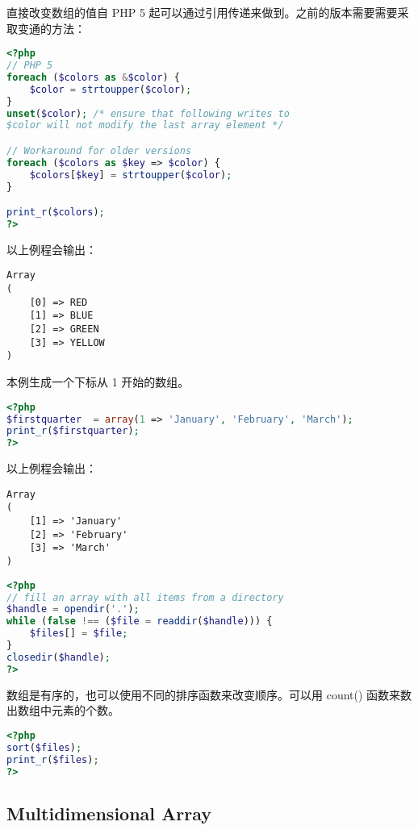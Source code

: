 直接改变数组的值自 PHP 5 起可以通过引用传递来做到。之前的版本需要需要采取变通的方法：





\begin{lstlisting}[language=PHP]
<?php
// PHP 5
foreach ($colors as &$color) {
    $color = strtoupper($color);
}
unset($color); /* ensure that following writes to
$color will not modify the last array element */

// Workaround for older versions
foreach ($colors as $key => $color) {
    $colors[$key] = strtoupper($color);
}

print_r($colors);
?>
\end{lstlisting}

以上例程会输出：


\begin{verbatim}
Array
(
    [0] => RED
    [1] => BLUE
    [2] => GREEN
    [3] => YELLOW
)
\end{verbatim}


本例生成一个下标从 1 开始的数组。

\begin{lstlisting}[language=PHP]
<?php
$firstquarter  = array(1 => 'January', 'February', 'March');
print_r($firstquarter);
?>
\end{lstlisting}

以上例程会输出：


\begin{verbatim}
Array 
(
    [1] => 'January'
    [2] => 'February'
    [3] => 'March'
)
\end{verbatim}




\begin{lstlisting}[language=PHP]
<?php
// fill an array with all items from a directory
$handle = opendir('.');
while (false !== ($file = readdir($handle))) {
    $files[] = $file;
}
closedir($handle); 
?>
\end{lstlisting}

数组是有序的，也可以使用不同的排序函数来改变顺序。可以用 count() 函数来数出数组中元素的个数。

\begin{lstlisting}[language=PHP]
<?php
sort($files);
print_r($files);
?>
\end{lstlisting}

\subsection{Multidimensional Array}



